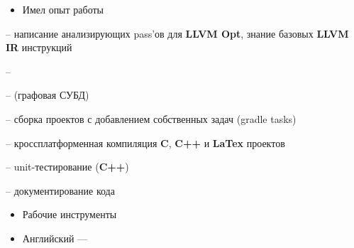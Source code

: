 \documentclass[10pt,a4paper,ragged2e,withhyper]{custom-altacv}
\begin{document}
\begin{paracol}{2}
\divider

\begin{itemize}
	\item \textcolor{emphasis}{Имел опыт работы}
\end{itemize}

 -- написание анализирующих pass'ов для \textbf{LLVM Opt}, знание базовых \textbf{LLVM IR} инструкций
\vspace{1ex}

 -- 
\vspace{-.2ex}

 --  (графовая СУБД)
\vspace{1ex}

 -- сборка проектов с добавлением собственных задач (gradle tasks)
\vspace{1ex}

 -- кроссплатформенная компиляция \textbf{C}, \textbf{C++} и \textbf{LaTex} проектов
\vspace{1ex}

 -- unit-тестирование (\textbf{C++})
\vspace{1ex}

 -- документирование кода
\vspace{1ex}

\vspace{1ex}

\divider

\begin{itemize}
	\item\textcolor{emphasis}{Рабочие инструменты}
\end{itemize}





\begin{itemize}
	\item Английский --- 
\end{itemize}

\end{paracol}
\end{document}

